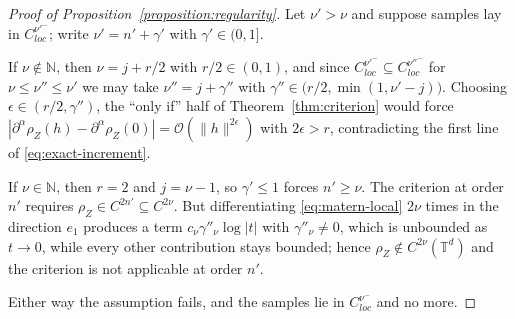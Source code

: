 \documentclass[pdflatex,sn-mathphys,Numbered]{sn-jnl}
\theoremstyle{thmstyleone}%
\theoremstyle{thmstyletwo}%
\theoremstyle{thmstylethree}%
\newcommand{\NN}{\mathbb{N}}
\newcommand{\TT}{\mathbb{T}}
\newcommand{\calO}{\mathcal{O}}
\begin{document}
\begin{appendices}
\begin{proof}[Proof of Proposition~\ref{proposition:regularity}]
Let $\nu' > \nu$ and suppose samples lay in
$C^{\nu'^-}_{loc}$; write $\nu' = n' + \gamma'$ with $\gamma' \in (0,1]$.

If $\nu \notin \NN$, then $\nu = j + r/2$ with $r/2 \in (0,1)$, and since
$C^{\nu'^-}_{loc} \subseteq C^{\nu''^-}_{loc}$ for $\nu \le \nu'' \le \nu'$ we
may take $\nu'' = j+\gamma''$ with $\gamma'' \in \bigl(r/2,\min(1,\nu'-j)\bigr)$.
Choosing $\epsilon \in (r/2,\gamma'')$, the ``only if'' half of
Theorem~\ref{thm:criterion} would force
$|\partial^\alpha\rho_Z(h)-\partial^\alpha\rho_Z(0)| = \calO(\|h\|^{2\epsilon})$
with $2\epsilon > r$, contradicting the first line of
\eqref{eq:exact-increment}.

If $\nu \in \NN$, then $r = 2$ and $j = \nu-1$, so $\gamma' \leq 1$ forces
$n' \geq \nu$. The criterion at order $n'$ requires $\rho_Z \in C^{2n'}
\subseteq C^{2\nu}$. But differentiating \eqref{eq:matern-local} $2\nu$ times in
the direction $e_1$ produces a term $c_\nu\gamma''_\nu\log|t|$ with
$\gamma''_\nu \neq 0$, which is unbounded as $t\to0$, while every other
contribution stays bounded; hence $\rho_Z \notin C^{2\nu}(\TT^d)$ and the
criterion is not applicable at order $n'$.

Either way the assumption fails, and the samples lie in $C^{\nu^-}_{loc}$ and no
more.
\end{proof}

\end{appendices}
\end{document}
